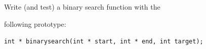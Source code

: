 Write (and test) a binary search function with the

following prototype:



\verb!int * binarysearch(int * start, int * end, int target);!


